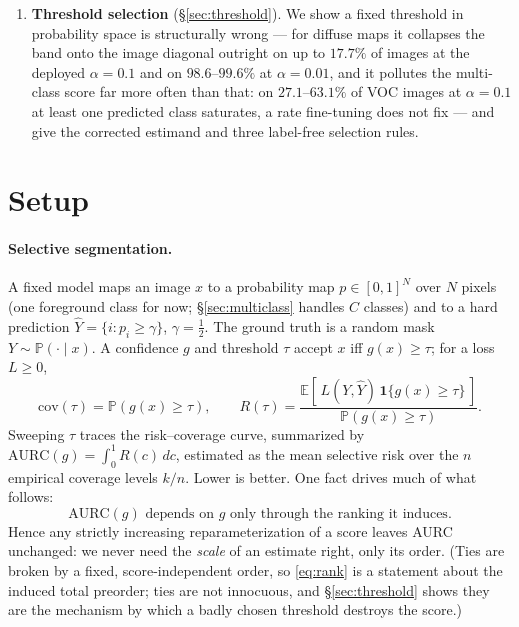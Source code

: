 \documentclass[11pt]{article}
\theoremstyle{remark}
\newcommand{\Yhat}{\widehat{Y}}
\newcommand{\AURC}{\mathrm{AURC}}
\newcommand{\Ex}{\mathbb{E}}
\newcommand{\Prb}{\mathbb{P}}
\begin{document}
\begin{enumerate}
\item \textbf{Threshold selection} (\S\ref{sec:threshold}). We show a fixed
threshold in probability space is structurally wrong --- for diffuse maps it
collapses the band onto the image diagonal outright on up to $17.7\%$ of images at
the deployed $\alpha=0.1$ and on $98.6$--$99.6\%$ at $\alpha=0.01$, and it pollutes
the multi-class score far more often than that: on $27.1$--$63.1\%$ of VOC images at
$\alpha=0.1$ at least one predicted class saturates, a rate fine-tuning does not fix
--- and give the corrected estimand and three label-free selection rules.
\end{enumerate}

\section{Setup}\label{sec:setup}

\paragraph{Selective segmentation.}
A fixed model maps an image $x$ to a probability map $p\in[0,1]^N$ over $N$ pixels
(one foreground class for now; \S\ref{sec:multiclass} handles $C$ classes) and to a
hard prediction $\Yhat = \{i : p_i \ge \gamma\}$, $\gamma=\tfrac12$. The ground
truth is a random mask $Y \sim \Prb(\cdot\mid x)$. A confidence $g$ and threshold
$\tau$ accept $x$ iff $g(x)\ge\tau$; for a loss $L\ge 0$,
\begin{equation}
\mathrm{cov}(\tau) = \Prb(g(x)\ge\tau),
\qquad
R(\tau) = \frac{\Ex[\,L(Y,\Yhat)\,\mathbf{1}\{g(x)\ge\tau\}\,]}{\Prb(g(x)\ge\tau)} .
\end{equation}
Sweeping $\tau$ traces the risk--coverage curve, summarized by
$\AURC(g)=\int_0^1 R(c)\,dc$, estimated as the mean selective risk over the $n$
empirical coverage levels $k/n$. Lower is better. One fact drives much of what
follows:
\begin{equation}\label{eq:rank}
\AURC(g) \text{ depends on } g \text{ only through the ranking it induces.}
\end{equation}
Hence any strictly increasing reparameterization of a score leaves AURC unchanged:
we never need the \emph{scale} of an estimate right, only its order.
(Ties are broken by a fixed, score-independent order, so \eqref{eq:rank} is a
statement about the induced total preorder; ties are not innocuous, and
\S\ref{sec:threshold} shows they are the mechanism by which a badly chosen
threshold destroys the score.)
\end{document}
